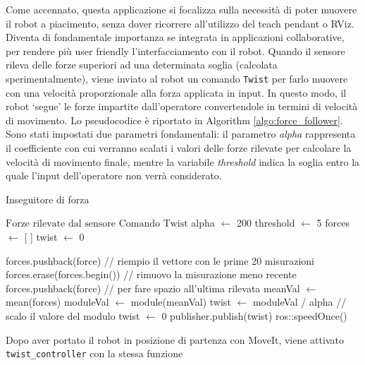 Come accennato, questa applicazione si focalizza sulla necessit\`{a} di poter muovere il robot a piacimento, senza dover 
ricorrere all'utilizzo del teach pendant o RViz. 
Diventa di fondamentale importanza se integrata in applicazioni collaborative, per rendere pi\`{u} user friendly l'interfacciamento 
con il robot. 
Quando il sensore rileva delle forze superiori ad una determinata soglia (calcolata sperimentalmente), viene inviato al robot un 
comando \verb|Twist| per farlo muovere con una velocit\`{a} proporzionale alla forza applicata in input. In questo modo, il robot `segue' 
le forze impartite dall'operatore convertendole in termini di velocit\`{a} di movimento\footnotemark{}. 
Lo pseudocodice \`{e} riportato in Algorithm \ref{algo:force_follower}. Sono stati impostati due parametri fondamentali: il parametro 
\textit{alpha} rappresenta il coefficiente con cui verranno scalati i valori delle forze rilevate per calcolare la velocit\`{a} di 
movimento finale, mentre la variabile \textit{threshold} indica la soglia entro la quale l'input dell'operatore non verr\`{a} 
considerato.
\begin{algorithm}[H]
\caption{Inseguitore di forza}\label{algo:force_follower}
\begin{algorithmic}[1]
    \Require $\text{Forze rilevate dal sensore}$
    \Ensure $\text{Comando Twist}$
    \State alpha $\gets$ 200
    \State threshold $\gets$ 5
    \State forces $\gets$ [ ]
    \State twist $\gets$ 0
    
        \State forces.pushback(force) // riempio il vettore con le prime 20 misurazioni
    \Else
        \State forces.erase(forces.begin()) // rimuovo la misurazione meno recente
        \State forces.pushback(force) // per fare spazio all'ultima rilevata
        \State meanVal $\gets$ mean(forces)
        \State moduleVal $\gets$ module(meanVal) 
            \State twist $\gets$ moduleVal / alpha // scalo il valore del modulo
        \Else
            \State twist $\gets$ 0
        \EndIf
        \State publisher.publish(twist)
    \EndIf
    \State ros::speedOnce()
    \EndWhile
\end{algorithmic}
\end{algorithm}
Dopo aver portato il robot in posizione di partenza con MoveIt, viene attivato \verb|twist_controller| con la stessa funzione 
